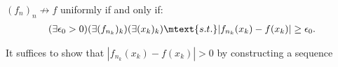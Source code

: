     \begin{lemma}
        $(f_n)_n \not\rightarrow f$ uniformly if and only if:
            \begin{equation*}
            \begin{split}
                (\exists \epsilon_0 > 0)(\exists (f_{n_k})_k)(\exists(x_k)_k) \mtext{s.t.} |f_{n_k}(x_k) - f(x_k)| \geq \epsilon_0.
            \end{split}
            \end{equation*}
    \end{lemma}
        \begin{remark}
            It suffices to show that $|f_{n_k}(x_k) - f(x_k)| > 0$ by constructing a sequence 
        \end{remark}